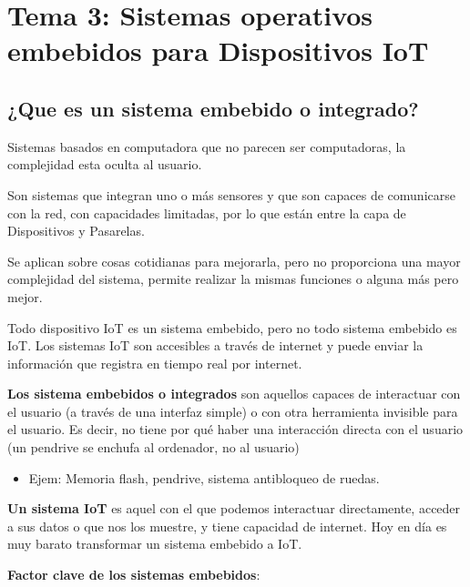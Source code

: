 \documentclass[12pt]{report} %
\begin{document}
\chapter{Tema 3: Sistemas operativos embebidos para Dispositivos
IoT}

\section{¿Que es un sistema embebido o
integrado?}

Sistemas basados en computadora que no parecen ser computadoras, la complejidad esta oculta al usuario.

Son sistemas que integran uno o más sensores y que son capaces de
comunicarse con la red, con capacidades limitadas, por lo que están
entre la capa de Dispositivos y Pasarelas.

Se aplican sobre cosas cotidianas para mejorarla, pero no
proporciona una mayor complejidad del sistema, permite realizar la
mismas funciones o alguna más pero mejor.

Todo dispositivo IoT es un sistema embebido, pero no todo sistema
embebido es IoT. Los sistemas IoT son accesibles a través de internet y
puede enviar la información que registra en tiempo real por internet.

\textbf{Los sistema embebidos o integrados} son aquellos capaces de
interactuar con el usuario (a través de una interfaz simple) o con otra herramienta invisible para el usuario. Es decir, no tiene por qué haber una interacción directa con el usuario (un pendrive se enchufa al ordenador, no al usuario)

\begin{itemize}

\item
  Ejem: Memoria flash, pendrive, sistema antibloqueo de ruedas.
\end{itemize}

\textbf{Un sistema IoT} es aquel con el que podemos interactuar
directamente, acceder a sus datos o que nos los muestre, y tiene
capacidad de internet. Hoy en día es muy barato transformar un sistema
embebido a IoT.

\textbf{Factor clave de los sistemas embebidos}:
\end{document}
